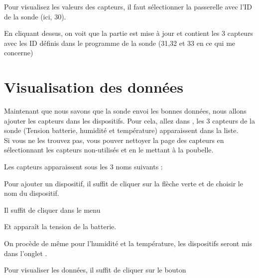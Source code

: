 
Pour visualisez les valeurs des capteurs, il faut sélectionner la passerelle avec l'ID de la sonde (ici, 30).


En cliquant dessus, on voit que la partie  est mise à jour et contient les 3 capteurs avec les ID définis dans le programme de la sonde (31,32 et 33 en ce qui me concerne)



\section{Visualisation des données}

Maintenant que nous savons que la sonde envoi les bonnes données, nous allons ajouter les capteurs dans les dispositifs.
Pour cela, allez dans , les 3 capteurs de la sonde (Tension batterie, humidité et température) apparaissent dans la liste.\\
Si vous ne les trouvez pas, vous pouver nettoyer la page des capteurs en sélectionnant les capteurs non-utilisés et en le mettant à la poubelle.


Les capteurs apparaissent sous les 3 noms suivants : 


Pour ajouter un dispositif, il suffit de cliquer sur la flèche verte et de choisir le nom du dispositif.



Il suffit de cliquer dans le menu 


Et apparaît la tension de la batterie.


On procède de même pour l'humidité et la température, les dispositifs seront mis dans l'onglet  .



Pour visualiser les données, il suffit de cliquer sur le bouton 


